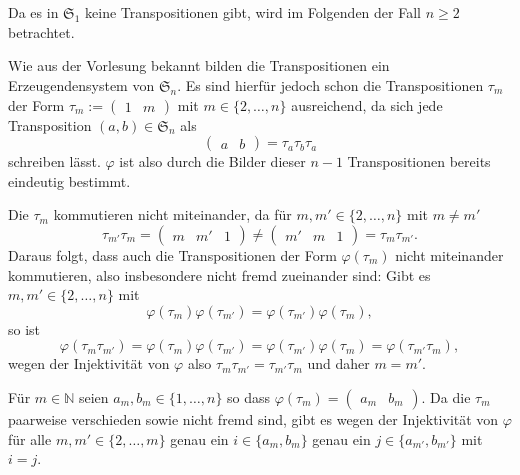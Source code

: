 \documentclass[a4paper,10pt]{article}
\theoremstyle{definition}
\newcommand{\N}{\mathbb{N}}
\newcommand{\Sn}{\mathfrak{S}}
\newcommand{\vect}[1]{\begin{pmatrix}#1\end{pmatrix}}
\begin{document}
\section{}
Da es in $\Sn_1$ keine Transpositionen gibt, wird im Folgenden der Fall $n \geq 2$ betrachtet.

Wie aus der Vorlesung bekannt bilden die Transpositionen ein Erzeugendensystem von $\Sn_n$. Es sind hierfür jedoch schon die Transpositionen $\tau_m$ der Form $\tau_m := \vect{1 & m}$ mit \mbox{$m \in \{2, \ldots, n\}$} ausreichend, da sich jede Transposition $(a,b) \in \Sn_n$ als
\[
 \vect{a & b} = \tau_a \tau_b \tau_a
\]
schreiben lässt. $\varphi$ ist also durch die Bilder dieser $n-1$ Transpositionen bereits eindeutig bestimmt.

Die $\tau_m$ kommutieren nicht miteinander, da für $m, m' \in \{2,\ldots,n\}$ mit $m \neq m'$
\[
 \tau_{m'} \tau_m = \vect{m & m' & 1} \neq \vect{m' & m & 1} = \tau_m \tau_{m'}.
\]
Daraus folgt, dass auch die Transpositionen der Form $\varphi(\tau_m)$ nicht miteinander kommutieren, also insbesondere nicht fremd zueinander sind: Gibt es $m, m' \in \{2, \ldots, n\}$ mit
\[
 \varphi(\tau_m)\varphi(\tau_{m'}) = \varphi(\tau_{m'})\varphi(\tau_m),
\]
so ist
\[
 \varphi(\tau_m \tau_{m'})
 = \varphi(\tau_m)\varphi(\tau_{m'})
 = \varphi(\tau_{m'})\varphi(\tau_m)
 = \varphi(\tau_{m'} \tau_m),
\]
wegen der Injektivität von $\varphi$ also $\tau_m \tau_{m'} = \tau_{m'} \tau_m$ und daher $m = m'$.

Für $m \in \N$ seien $a_m, b_m \in \{1,\ldots,n\}$ so dass $\varphi(\tau_m) = \vect{a_m & b_m}$. Da die $\tau_m$ paarweise verschieden sowie nicht fremd sind, gibt es wegen der Injektivität von $\varphi$ für alle $m, m' \in \{2, \ldots, m\}$ genau ein $i \in \{a_m, b_m\}$ genau ein $j \in \{a_{m'}, b_{m'}\}$ mit $i = j$.
\end{document}

